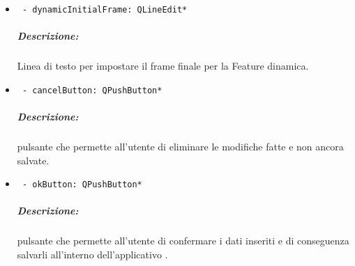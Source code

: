\begin{itemize}
\item \color{teal}\verb! - dynamicInitialFrame: QLineEdit*!
\color{black} 
\subparagraph{Descrizione:} Linea di testo per impostare il frame finale per la Feature\g{} dinamica.

\item \color{teal}\verb! - cancelButton: QPushButton*!
\color{black} 
\subparagraph{Descrizione:} pulsante che permette all'utente di eliminare le modifiche fatte e non ancora salvate.

\item \color{teal}\verb! - okButton: QPushButton*!
\color{black} 
\subparagraph{Descrizione:} pulsante che permette all'utente di confermare i dati inseriti e di conseguenza salvarli all'interno dell'applicativo \project{}.
\end{itemize}
